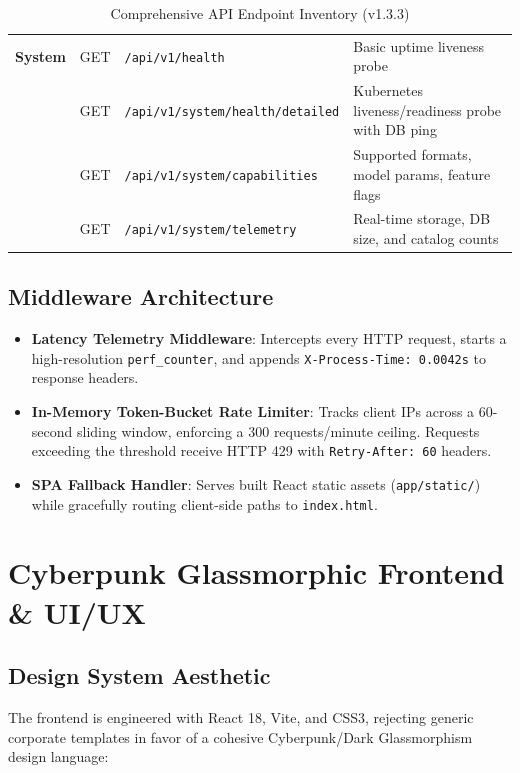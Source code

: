 \documentclass[11pt,a4paper]{article}
\begin{document}
\begin{table}[h!]
\begin{tabularx}{\textwidth}{lllX}
\midrule
\textbf{System} & GET & \texttt{/api/v1/health} & Basic uptime liveness probe \\
& GET & \texttt{/api/v1/system/health/detailed} & Kubernetes liveness/readiness probe with DB ping \\
& GET & \texttt{/api/v1/system/capabilities} & Supported formats, model params, feature flags \\
& GET & \texttt{/api/v1/system/telemetry} & Real-time storage, DB size, and catalog counts \\
\bottomrule
\end{tabularx}
\caption{Comprehensive API Endpoint Inventory (v1.3.3)}
\end{table}

\subsection{Middleware Architecture}
\begin{itemize}[leftmargin=*]
    \item \textbf{Latency Telemetry Middleware}: Intercepts every HTTP request, starts a high-resolution \texttt{perf\_counter}, and appends \texttt{X-Process-Time: 0.0042s} to response headers.
    \item \textbf{In-Memory Token-Bucket Rate Limiter}: Tracks client IPs across a 60-second sliding window, enforcing a 300 requests/minute ceiling. Requests exceeding the threshold receive HTTP 429 with \texttt{Retry-After: 60} headers.
    \item \textbf{SPA Fallback Handler}: Serves built React static assets (\texttt{app/static/}) while gracefully routing client-side paths to \texttt{index.html}.
\end{itemize}

\section{Cyberpunk Glassmorphic Frontend \& UI/UX}

\subsection{Design System Aesthetic}
The frontend is engineered with React 18, Vite, and CSS3, rejecting generic corporate templates in favor of a cohesive Cyberpunk/Dark Glassmorphism design language:
\end{document}
